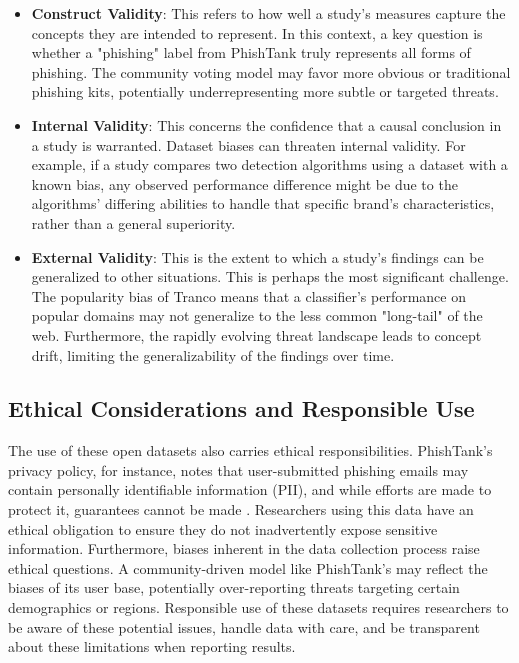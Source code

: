\documentclass[journal,article,submit,pdftex,moreauthors]{Definitions/mdpi}
\begin{document}
\begin{itemize}
\item \textbf{Construct Validity}: This refers to how well a study's measures capture the concepts they are intended to represent. In this context, a key question is whether a "phishing" label from PhishTank truly represents all forms of phishing. The community voting model may favor more obvious or traditional phishing kits, potentially underrepresenting more subtle or targeted threats.
\item \textbf{Internal Validity}: This concerns the confidence that a causal conclusion in a study is warranted. Dataset biases can threaten internal validity. For example, if a study compares two detection algorithms using a dataset with a known bias, any observed performance difference might be due to the algorithms' differing abilities to handle that specific brand's characteristics, rather than a general superiority.
\item \textbf{External Validity}: This is the extent to which a study's findings can be generalized to other situations. This is perhaps the most significant challenge. The popularity bias of Tranco means that a classifier's performance on popular domains may not generalize to the less common "long-tail" of the web. Furthermore, the rapidly evolving threat landscape leads to concept drift, limiting the generalizability of the findings over time.
\end{itemize}

\subsection{Ethical Considerations and Responsible Use}

The use of these open datasets also carries ethical responsibilities. PhishTank's privacy policy, for instance, notes that user-submitted phishing emails may contain personally identifiable information (PII), and while efforts are made to protect it, guarantees cannot be made \citep{ref-26}. Researchers using this data have an ethical obligation to ensure they do not inadvertently expose sensitive information. Furthermore, biases inherent in the data collection process raise ethical questions. A community-driven model like PhishTank's may reflect the biases of its user base, potentially over-reporting threats targeting certain demographics or regions. Responsible use of these datasets requires researchers to be aware of these potential issues, handle data with care, and be transparent about these limitations when reporting results.
\end{document}
